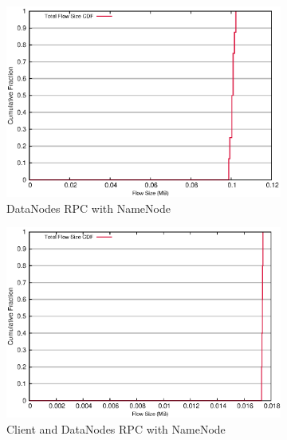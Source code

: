 \begin{figure}[!ht]
\label{fig:write_size}
\centering
  \begin{subfigure}[b]{.45\linewidth}
   \centering
	\includegraphics[width=.99\textwidth]{figures/6writes/24_28_type_flow_size.eps} 
	\caption{DataNodes RPC with NameNode}\label{fig:write_size:dn_rpc}
   \end{subfigure}%
  \begin{subfigure}[b]{.45\linewidth}
   \centering
	\includegraphics[width=.99\textwidth]{figures/6writes/24_28_20_16_type_flow_size.eps} 
	\caption{Client and DataNodes RPC with NameNode}\label{fig:write_size:dc_rpc}
   \end{subfigure} \\%
  \begin{subfigure}[b]{.45\linewidth}
   \centering

\end{subfigure}
\end{figure}
